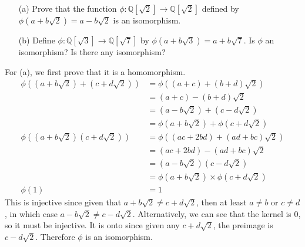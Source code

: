   \begin{exercise}[Shifrin 4.2.1]
    \begin{enumerate}
      \item[(a)] Prove that the function $\phi: \mathbb{Q}[\sqrt{2}] \to \mathbb{Q}[\sqrt{2}]$ defined by $\phi(a + b\sqrt{2}) = a - b\sqrt{2}$ is an isomorphism.
      \item[(b)] Define $\phi: \mathbb{Q}[\sqrt{3}] \to \mathbb{Q}[\sqrt{7}]$ by $\phi(a + b\sqrt{3}) = a + b\sqrt{7}$. Is $\phi$ an isomorphism? Is there any isomorphism?
    \end{enumerate}
  \end{exercise}
  \begin{solution}
    For (a), we first prove that it is a homomorphism. 
    \begin{align}
      \phi((a + b \sqrt{2}) + (c + d \sqrt{2})) & = \phi((a + c) + (b + d) \sqrt{2}) \\
                                                & = (a + c) - (b + d) \sqrt{2} \\
                                                & = (a - b \sqrt{2}) + (c - d \sqrt{2}) \\
                                                & = \phi(a + b \sqrt{2}) + \phi(c + d \sqrt{2}) \\
      \phi((a + b \sqrt{2}) (c + d \sqrt{2})) & = \phi((ac + 2bd) + (ad + bc) \sqrt{2}) \\
                                              & = (ac + 2bd) - (ad + bc) \sqrt{2} \\
                                              & =  (a - b \sqrt{2}) (c - d \sqrt{2}) \\
                                              & = \phi(a + b \sqrt{2}) \times \phi(c + d \sqrt{2}) \\ 
                                      \phi(1) & = 1
    \end{align}
    This is injective since given that $a + b \sqrt{2} \neq c + d \sqrt{2}$, then at least $a \neq b$ or $c \neq d$, in which case $a - b \sqrt{2} \neq c - d \sqrt{2}$. Alternatively, we can see that the kernel is $0$, so it must be injective. It is onto since given any $c + d\sqrt{2}$, the preimage is $c - d \sqrt{2}$. Therefore $\phi$ is an isomorphism.  


\end{solution}
